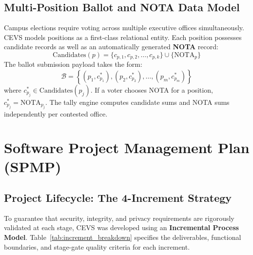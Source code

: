 \documentclass[12pt,a4paper,oneside]{report}
\begin{document}
\section{Multi-Position Ballot and NOTA Data Model}
Campus elections require voting across multiple executive offices simultaneously. CEVS models positions as a first-class relational entity. Each position possesses candidate records as well as an automatically generated \textbf{NOTA} record:
\begin{equation}
    \text{Candidates}(p) = \{ c_{p,1}, c_{p,2}, \dots, c_{p,k} \} \cup \{ \text{NOTA}_p \}
\end{equation}
The ballot submission payload takes the form:
\begin{equation}
    \mathcal{B} = \left\{ (p_1, c^*_{p_1}), (p_2, c^*_{p_2}), \dots, (p_m, c^*_{p_m}) \right\}
\end{equation}
where $c^*_{p_j} \in \text{Candidates}(p_j)$. If a voter chooses NOTA for a position, $c^*_{p_j} = \text{NOTA}_{p_j}$. The tally engine computes candidate sums and NOTA sums independently per contested office.

\chapter{Software Project Management Plan (SPMP)}
\label{chap:spmp}

\section{Project Lifecycle: The 4-Increment Strategy}
To guarantee that security, integrity, and privacy requirements are rigorously validated at each stage, CEVS was developed using an \textbf{Incremental Process Model}. Table~\ref{tab:increment_breakdown} specifies the deliverables, functional boundaries, and stage-gate quality criteria for each increment.
\end{document}
